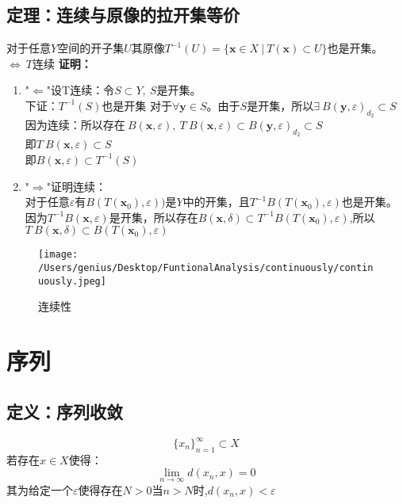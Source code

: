 \documentclass[11pt]{article}
\begin{document}
\begin{CJK*}{UTF8}{gbsn}
\subsection{定理：连续与原像的拉开集等价}
对于任意$Y$空间的开子集$U$其原像$ T^{-1}(U)=\{\bm x\in X~|~T(\bm x)\subset U\}$也是开集。$\Leftrightarrow~T$连续
\textbf{证明：}\\
\begin{enumerate}
	\item "$\Leftarrow$"设T连续：令$ S\subset Y,~S$是开集。\\
	下证：$ T^{-1}(S)$也是开集
	 对于$\forall \bm y\in S$。由于$S$是开集，所以$\exists~B(\bm y,\varepsilon )_{d_2}\subset S$\\
		因为连续：所以存在$~B(\bm x,\varepsilon ),~T~B(\bm x,\varepsilon )\subset B(\bm y,\varepsilon )_{d_2}\subset S$\\
		即$ T~B(\bm x,\varepsilon )\subset S$\\
		即$ B(\bm x,\varepsilon )\subset T^{-1}(S)$
	
	\item "$\Rightarrow$"证明连续：\\
		对于任意$\varepsilon$有$B(T(\bm x_0),\varepsilon ))$是$Y$中的开集，且$T^{-1}B(T(\bm x_0),\varepsilon )$也是开集。\\
		因为$T^{-1}B(\bm x,\varepsilon )$是开集，所以存在$B(\bm x,\delta )\subset T^{-1}B(T(\bm x_0),\varepsilon )$,所以$T~B(\bm x,\delta )\subset B(T(\bm x_0),\varepsilon )$
\end{enumerate}
\begin{figure}[H]
\center
  \texttt{[image: /Users/genius/Desktop/FuntionalAnalysis/continuously/continuously.jpeg]}
  \caption{连续性}
\end{figure}
\section{序列}
\subsection{定义：序列收敛}
\begin{equation}
	\{x_n\}_{n=1}^{\infty}\subset X
\end{equation}
若存在$x\in X$使得：
\begin{equation*}
	\mathop{lim}_{n\rightarrow \infty}d(x_n,x)=0
\end{equation*}
其为给定一个$\varepsilon$使得存在$N>0$当$n>N时$,$d(x_n,x)<\varepsilon$\\


\end{CJK*}
\end{document}
